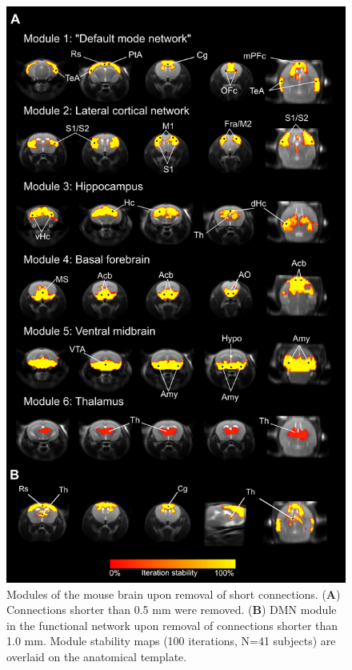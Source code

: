 \begin{figure}[th]
    \centering
    \includegraphics[scale=0.85]{figures/hubs_figure_s4_modules_short_edges_removed.png}
    \decoRule
    \caption[Modules of the mouse brain upon removal of short
    connections.]{Modules of the mouse brain upon removal of short connections.
    (\textbf{A}) Connections shorter than 0.5 mm were removed. (\textbf{B}) DMN
    module in the functional network upon removal of connections shorter than
    1.0 mm. Module stability maps (100 iterations, N=41 subjects) are overlaid
    on the anatomical template.}
    \label{fig:hubs_figs4_short_connections}
\end{figure}


